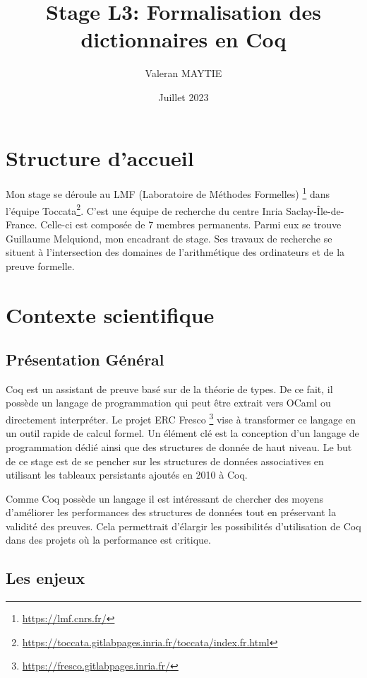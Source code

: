 \documentclass{article}
\title{Stage L3: Formalisation des dictionnaires en Coq}
\author{Valeran MAYTIE}
\date{Juillet 2023}
\begin{document}
  \maketitle

  \section{Structure d'accueil}

  Mon stage se déroule au LMF (Laboratoire de Méthodes Formelles)
\footnote{\url{https://lmf.cnrs.fr/}} dans l'équipe Toccata\footnote{
\url{https://toccata.gitlabpages.inria.fr/toccata/index.fr.html}}. C'est une
équipe de recherche du centre Inria Saclay-Île-de-France. Celle-ci est composée
de 7 membres permanents. Parmi eux se trouve Guillaume Melquiond, mon encadrant
de stage. Ses travaux de recherche se situent à l'intersection des domaines de
l'arithmétique des ordinateurs et de la preuve formelle.

  \section{Contexte scientifique}

    \subsection{Présentation Général}

  Coq est un assistant de preuve basé sur de la théorie de types. De ce fait, il
possède un langage de programmation qui peut être extrait vers OCaml ou
directement interpréter. Le projet ERC Fresco
\footnote{\url{https://fresco.gitlabpages.inria.fr/}} vise à transformer
ce langage en un outil rapide de calcul formel. Un élément clé est la conception
d'un langage de programmation dédié ainsi que des structures de donnée de haut
niveau. Le but de ce stage est de se pencher sur les structures de données
associatives en utilisant les tableaux persistants ajoutés en 2010 à Coq.

  Comme Coq possède un langage il est intéressant de chercher des moyens
d'améliorer les performances des structures de données tout en préservant la
validité des preuves. Cela permettrait d'élargir les possibilités d'utilisation
de Coq dans des projets où la performance est critique.

    \subsection{Les enjeux}
\end{document}
